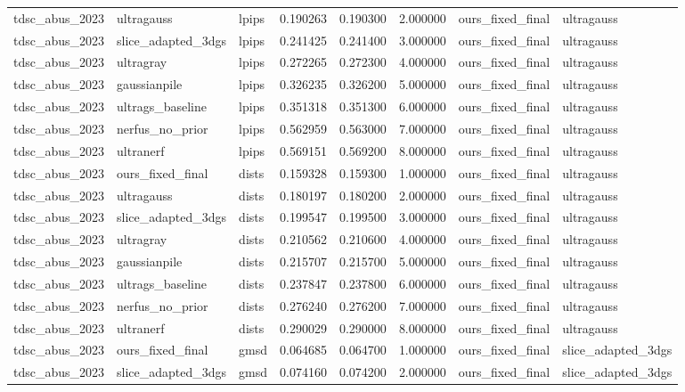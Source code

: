 \begin{tabular}{llllllll}
tdsc\_abus\_2023 & ultragauss & lpips & 0.190263 & 0.190300 & 2.000000 & ours\_fixed\_final & ultragauss \\
tdsc\_abus\_2023 & slice\_adapted\_3dgs & lpips & 0.241425 & 0.241400 & 3.000000 & ours\_fixed\_final & ultragauss \\
tdsc\_abus\_2023 & ultragray & lpips & 0.272265 & 0.272300 & 4.000000 & ours\_fixed\_final & ultragauss \\
tdsc\_abus\_2023 & gaussianpile & lpips & 0.326235 & 0.326200 & 5.000000 & ours\_fixed\_final & ultragauss \\
tdsc\_abus\_2023 & ultrags\_baseline & lpips & 0.351318 & 0.351300 & 6.000000 & ours\_fixed\_final & ultragauss \\
tdsc\_abus\_2023 & nerfus\_no\_prior & lpips & 0.562959 & 0.563000 & 7.000000 & ours\_fixed\_final & ultragauss \\
tdsc\_abus\_2023 & ultranerf & lpips & 0.569151 & 0.569200 & 8.000000 & ours\_fixed\_final & ultragauss \\
tdsc\_abus\_2023 & ours\_fixed\_final & dists & 0.159328 & 0.159300 & 1.000000 & ours\_fixed\_final & ultragauss \\
tdsc\_abus\_2023 & ultragauss & dists & 0.180197 & 0.180200 & 2.000000 & ours\_fixed\_final & ultragauss \\
tdsc\_abus\_2023 & slice\_adapted\_3dgs & dists & 0.199547 & 0.199500 & 3.000000 & ours\_fixed\_final & ultragauss \\
tdsc\_abus\_2023 & ultragray & dists & 0.210562 & 0.210600 & 4.000000 & ours\_fixed\_final & ultragauss \\
tdsc\_abus\_2023 & gaussianpile & dists & 0.215707 & 0.215700 & 5.000000 & ours\_fixed\_final & ultragauss \\
tdsc\_abus\_2023 & ultrags\_baseline & dists & 0.237847 & 0.237800 & 6.000000 & ours\_fixed\_final & ultragauss \\
tdsc\_abus\_2023 & nerfus\_no\_prior & dists & 0.276240 & 0.276200 & 7.000000 & ours\_fixed\_final & ultragauss \\
tdsc\_abus\_2023 & ultranerf & dists & 0.290029 & 0.290000 & 8.000000 & ours\_fixed\_final & ultragauss \\
tdsc\_abus\_2023 & ours\_fixed\_final & gmsd & 0.064685 & 0.064700 & 1.000000 & ours\_fixed\_final & slice\_adapted\_3dgs \\
tdsc\_abus\_2023 & slice\_adapted\_3dgs & gmsd & 0.074160 & 0.074200 & 2.000000 & ours\_fixed\_final & slice\_adapted\_3dgs \\

\end{tabular}
